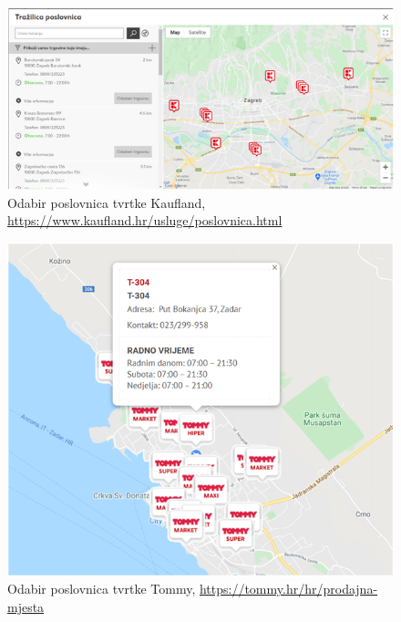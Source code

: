 		\begin{figure}[H]
			\includegraphics[scale=1]{slike/gmaps_p1.png} %
			\centering
			\caption{Odabir poslovnica tvrtke Kaufland,
				\url{https://www.kaufland.hr/usluge/poslovnica.html}
			}
			\label{fig:promjene}
		\end{figure}
	
		\begin{figure}[H]
			\includegraphics[scale=1]{slike/slika_2.png} %
			\centering
			\caption{Odabir poslovnica tvrtke Tommy,
				\url{ https://tommy.hr/hr/prodajna-mjesta}
			}
			\label{fig:promjene}
		\end{figure}

		
		\eject
		
	
